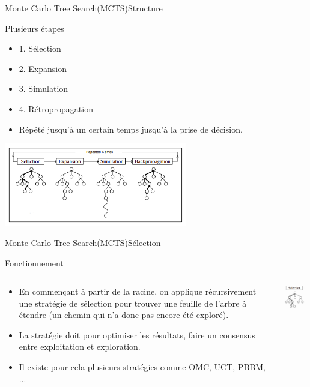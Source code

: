 \begin{frame}{Monte Carlo Tree Search(MCTS)}{Structure}
    \begin{block}{Plusieurs étapes}
	    	\begin{itemize}
	    		\item 1. Sélection
	    		\item 2. Expansion
	    		\item 3. Simulation
	    		\item 4. Rétropropagation
	    		\item Répété jusqu'à un certain temps jusqu'à la prise de décision.
	    	\end{itemize}
		\begin{center}
			\includegraphics[width=8cm]{ressources/MCTSEtapes}
		\end{center}
	\end{block}
\end{frame}

\begin{frame}{Monte Carlo Tree Search(MCTS)}{Sélection}
\begin{block}{Fonctionnement}
	\begin{columns}
		\begin{column}{6cm}
			\begin{itemize}
				\item En commençant à partir de la racine, on applique récursivement une stratégie de sélection pour trouver une feuille de l'arbre à étendre (un chemin qui n'a donc pas encore été exploré).
				\item La stratégie doit pour optimiser les résultats, faire un consensus entre exploitation et exploration.
				\item Il existe pour cela plusieurs stratégies comme OMC, UCT, PBBM, ...
			\end{itemize}
		\end{column}
		\begin{column}{3cm}
			\includegraphics[width=3cm]{ressources/Selection.png}
		\end{column}
	\end{columns}
\end{block}
\end{frame}

